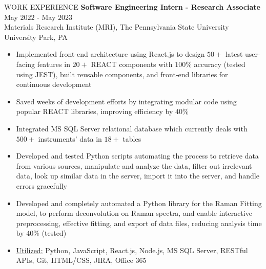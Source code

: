 \documentclass{resume} %
\begin{document}
\begin{rSection}{WORK EXPERIENCE}
{\bf Software Engineering Intern - Research Associate} \hfill May $2022$ - May $2023$\\
Materials Research Institute (MRI), The Pennsylvania State University \hfill University Park, PA
\begin{itemize}[itemsep = -4pt]
    \item Implemented front-end architecture using React.js to design $50+$ latest user-facing features in $20+$ REACT components with $100\%$ accuracy (tested using JEST), built reusable components, and front-end libraries for continuous development
    \item Saved weeks of development efforts by integrating modular code using popular REACT libraries, improving efficiency by $40\%$
    \item Integrated MS SQL Server relational database which currently deals with $500+$ instruments' data in $18+$ tables
    \item Developed and tested Python scripts automating the process to retrieve data from various sources, manipulate and analyze the data, filter out irrelevant data, look up similar data in the server, import it into the server, and handle errors gracefully
    \item Developed and completely automated a Python library for the Raman Fitting model, to perform deconvolution on Raman spectra, and enable interactive preprocessing, effective fitting, and export of data files, reducing analysis time by $40\%$ (tested)
    \item \underline{Utilized:} Python, JavaScript, React.js, Node.js, MS SQL Server, RESTful APIs, Git, HTML/CSS, JIRA, Office 365
\end{itemize}

\end{rSection} 


\end{document}
